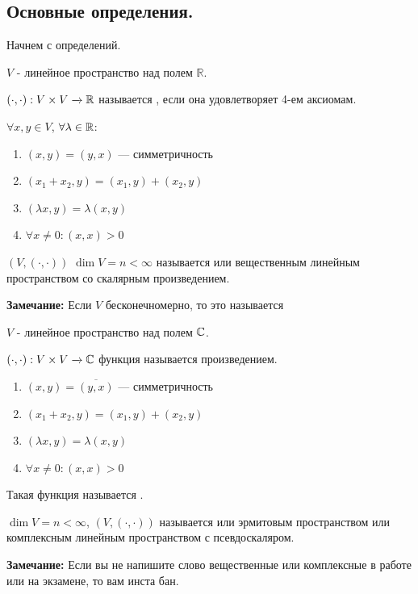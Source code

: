 \subsection{Основные определения.}

Начнем с определений. 

 $V$ - линейное пространство над полем $\mathbb{R}$.

$(\cdot, \cdot ): V\times V \xrightarrow{} \mathbb{R}$ называется , если она удовлетворяет 4-ем аксиомам.

$\forall x,y \in V$, $\forall \lambda \in \mathbb{R}$:

\begin{enumerate}
    \item $(x,y) = (y,x)$ --- симметричность
    \item $(x_1 +x_2,y) = (x_1,y)+(x_2,y)$
    \item $(\lambda x, y) = \lambda (x,y)$
    \item $\forall x \neq 0: (x,x)>0$
\end{enumerate}

 $(V, (\cdot, \cdot))$ $\dim V =n<\infty$ называется  или вещественным линейным пространством со скалярным произведением.

\textbf{Замечание:} Если $V$ бесконечномерно, то это называется 

 $V$ - линейное пространство над полем $\mathbb{C}$.

$(\cdot, \cdot): V\times V \xrightarrow{} \mathbb{C}$ функция называется  произведением.

\begin{enumerate}
    \item $(x,y) = \overline{(y,x)}$ --- симметричность
    \item $(x_1 +x_2,y) = (x_1,y)+(x_2,y)$
    \item $(\lambda x, y) = \lambda (x,y)$
    \item $\forall x \neq 0: (x,x)>0$
\end{enumerate}

Такая функция называется .

 $\dim V = n < \infty$, $(V, (\cdot, \cdot))$ называется  или эрмитовым пространством или комплексным линейным пространством с псевдоскаляром.


\textbf{Замечание:} Если вы не напишите слово вещественные или комплексные в работе или на экзамене, то вам инста бан.

